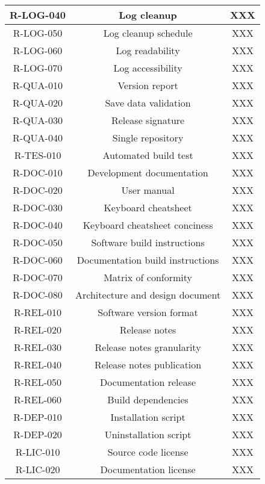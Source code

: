 \begin{longtable}{| c | c | c |}
  R-LOG-040 & Log cleanup & XXX \\ \hline
  R-LOG-050 & Log cleanup schedule & XXX \\ \hline
  R-LOG-060 & Log readability & XXX \\ \hline
  R-LOG-070 & Log accessibility & XXX \\ \hline
  R-QUA-010 & Version report & XXX \\ \hline
  R-QUA-020 & Save data validation & XXX \\ \hline
  R-QUA-030 & Release signature & XXX \\ \hline
  R-QUA-040 & Single repository & XXX \\ \hline
  R-TES-010 & Automated build test & XXX \\ \hline
  R-DOC-010 & Development documentation & XXX \\ \hline
  R-DOC-020 & User manual & XXX \\ \hline
  R-DOC-030 & Keyboard cheatsheet & XXX \\ \hline
  R-DOC-040 & Keyboard cheatsheet conciness & XXX \\ \hline
  R-DOC-050 & Software build instructions & XXX \\ \hline
  R-DOC-060 & Documentation build instructions & XXX \\ \hline
  R-DOC-070 & Matrix of conformity & XXX \\ \hline
  R-DOC-080 & Architecture and design document & XXX \\ \hline
  R-REL-010 & Software version format & XXX \\ \hline
  R-REL-020 & Release notes & XXX \\ \hline
  R-REL-030 & Release notes granularity & XXX \\ \hline
  R-REL-040 & Release notes publication & XXX \\ \hline
  R-REL-050 & Documentation release & XXX \\ \hline
  R-REL-060 & Build dependencies & XXX \\ \hline
  R-DEP-010 & Installation script & XXX \\ \hline
  R-DEP-020 & Uninstallation script & XXX \\ \hline
  R-LIC-010 & Source code license & XXX \\ \hline
  R-LIC-020 & Documentation license & XXX \\ \hline
\end{longtable}